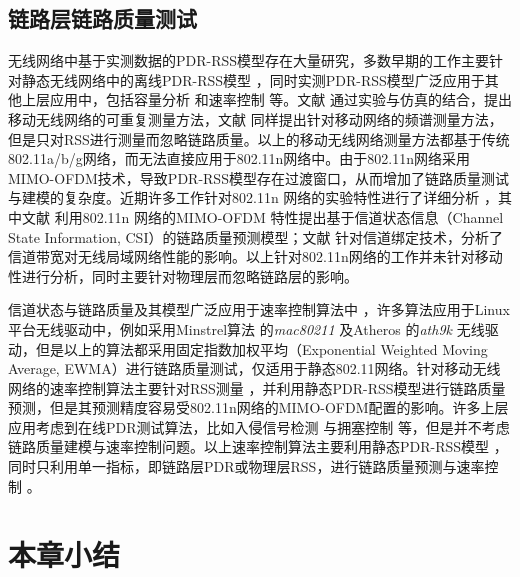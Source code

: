 \subsection{链路层链路质量测试}
\label{sec:mac}

无线网络中基于实测数据的PDR-RSS模型存在大量研究，多数早期的工作主要针对静态无线网络中的离线PDR-RSS模型 \cite{kolar2011mesh} \cite{reis2006model}，同时实测PDR-RSS模型广泛应用于其他上层应用中，包括容量分析 \cite{kashyap2007capacity} 和速率控制 \cite{chen2011ram} \cite{judd2008efficient} 等。文献 \cite{10.1109/TMC.2009.87} 通过实验与仿真的结合，提出移动无线网络的可重复测量方法，文献 \cite{kim2010sybot} 同样提出针对移动网络的频谱测量方法，但是只对RSS进行测量而忽略链路质量。以上的移动无线网络测量方法都基于传统802.11a/b/g网络，而无法直接应用于802.11n网络中。由于802.11n网络采用MIMO-OFDM技术，导致PDR-RSS模型存在过渡窗口，从而增加了链路质量测试与建模的复杂度。近期许多工作针对802.11n 网络的实验特性进行了详细分析 \cite{Halperin2010predictable} \cite{k.rayanchu:fluid:}，其中文献 \cite{Halperin2010predictable} 利用802.11n 网络的MIMO-OFDM 特性提出基于信道状态信息（Channel State Information, CSI）的链路质量预测模型；文献 \cite{k.rayanchu:fluid:} 针对信道绑定技术，分析了信道带宽对无线局域网络性能的影响。以上针对802.11n网络的工作并未针对移动性进行分析，同时主要针对物理层而忽略链路层的影响。

信道状态与链路质量及其模型广泛应用于速率控制算法中 \cite{kim2009experimental} \cite{Pefkianakis:2010} \cite{zhang2008practical} \cite{Li:2012:ERA:2348543.2348585}，许多算法应用于Linux平台无线驱动中，例如采用Minstrel算法 \cite{minstrel} 的\textit{mac80211} 及Atheros \cite{wong2008wireless}的\textit{ath9k} 无线驱动，但是以上的算法都采用固定指数加权平均（Exponential Weighted Moving Average, EWMA）进行链路质量测试，仅适用于静态802.11网络。针对移动无线网络的速率控制算法主要针对RSS测量 \cite{chen2011ram} \cite{judd2008efficient}，并利用静态PDR-RSS模型进行链路质量预测，但是其预测精度容易受802.11n网络的MIMO-OFDM配置的影响。许多上层应用考虑到在线PDR测试算法，比如入侵信号检测 \cite{5620919} 与拥塞控制 \cite{floyd2000equation} 等，但是并不考虑链路质量建模与速率控制问题。以上速率控制算法主要利用静态PDR-RSS模型 \cite{kashyap2007capacity} \cite{kolar2011mesh} \cite{reis2006model}，同时只利用单一指标，即链路层PDR或物理层RSS，进行链路质量预测与速率控制 \cite{judd2008efficient} \cite{zhang2008practical}。

\section{本章小结}

